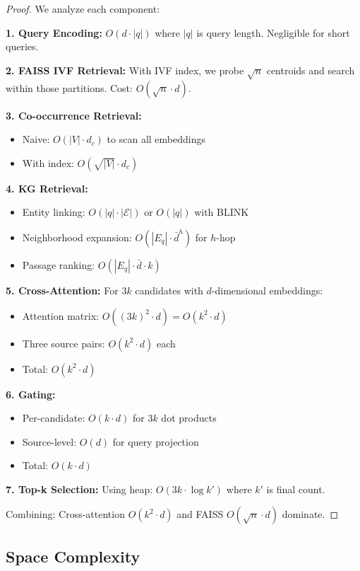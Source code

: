 \documentclass[11pt]{article}
\begin{document}
\begin{proof}
We analyze each component:

\textbf{1. Query Encoding:} $O(d \cdot |q|)$ where $|q|$ is query length. Negligible for short queries.

\textbf{2. FAISS IVF Retrieval:} With IVF index, we probe $\sqrt{n}$ centroids and search within those partitions. Cost: $O(\sqrt{n} \cdot d)$.

\textbf{3. Co-occurrence Retrieval:} 
\begin{itemize}
    \item Naive: $O(|V| \cdot d_c)$ to scan all embeddings
    \item With index: $O(\sqrt{|V|} \cdot d_c)$
\end{itemize}

\textbf{4. KG Retrieval:}
\begin{itemize}
    \item Entity linking: $O(|q| \cdot |\mathcal{E}|)$ or $O(|q|)$ with BLINK
    \item Neighborhood expansion: $O(|E_q| \cdot \bar{d}^h)$ for $h$-hop
    \item Passage ranking: $O(|E_q| \cdot \bar{d} \cdot k)$
\end{itemize}

\textbf{5. Cross-Attention:} For $3k$ candidates with $d$-dimensional embeddings:
\begin{itemize}
    \item Attention matrix: $O((3k)^2 \cdot d) = O(k^2 \cdot d)$
    \item Three source pairs: $O(k^2 \cdot d)$ each
    \item Total: $O(k^2 \cdot d)$
\end{itemize}

\textbf{6. Gating:}
\begin{itemize}
    \item Per-candidate: $O(k \cdot d)$ for $3k$ dot products
    \item Source-level: $O(d)$ for query projection
    \item Total: $O(k \cdot d)$
\end{itemize}

\textbf{7. Top-k Selection:} Using heap: $O(3k \cdot \log k')$ where $k'$ is final count.

Combining: Cross-attention $O(k^2 \cdot d)$ and FAISS $O(\sqrt{n} \cdot d)$ dominate.
\end{proof}

\subsection{Space Complexity}
\end{document}
